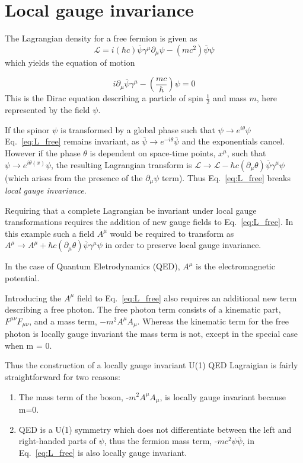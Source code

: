 \section{Local gauge invariance}
\label{subsec:gauge}
The Lagrangian density for a free fermion is given as
\begin{equation}
  \label{eq:L_free}
  \mathcal{L} = i(\hbar c)\overline{\psi}\gamma^{\mu}\partial_{\mu}\psi - (mc^{2})\overline{\psi}\psi
\end{equation}
which yields the equation of motion

\begin{equation}
 i\partial_{\mu}\overline{\psi}\gamma^{\mu} -  (\frac{mc}{\hbar})\psi = 0
\end{equation}
This is the Dirac equation describing a particle of spin $\frac{1}{2}$ and mass $m$, here represented by the field $\psi$. 

If the spinor $\psi$ is transformed by a global phase such that $\psi \to e^{i\theta}\psi$ Eq.~\ref{eq:L_free} remains invariant, as $\overline{\psi} \to e^{-i\theta}\overline{\psi}$ and the exponentials cancel. However if the phase $\theta$ is dependent on space-time points, $x^{\mu}$, such that $\psi \to e^{i\theta(x)}\psi$, the resulting Lagrangian transform is $\mathcal{L} \to \mathcal{L} - \hbar c(\partial_{\mu}\theta)\overline{\psi}\gamma^{\mu}\psi$ (which arises from the presence of the $\partial_{\mu}\psi$ term). Thus Eq.~\ref{eq:L_free} breaks \emph{local gauge invariance}.

Requiring that a complete Lagrangian be invariant under local gauge transformations requires the addition of new gauge fields to Eq.~\ref{eq:L_free}. In this example such a field $A^{\mu}$ would be required to transform as $A^{\mu} \to A^{\mu} + \hbar c(\partial_{\mu}\theta)\overline{\psi}\gamma^{\mu}\psi$ in order to preserve local gauge invariance.

In the case of Quantum Eletrodynamics (QED), $A^{\mu}$ is the electromagnetic potential.

Introducing the $A^{\mu}$ field to Eq.~\ref{eq:L_free} also requires an additional new term describing a free photon. The free photon term consists of a kinematic part, $F^{\mu\nu}F_{\mu\nu}$, and a mass term, $-m^{2}A^{\mu}A_{\mu}$. Whereas the kinematic term for the free photon is locally gauge invariant the mass term is not, except in the special case when m = 0.

Thus the construction of a locally gauge invariant U(1) QED Lagraigian is fairly straightforward for two reasons:
\begin{enumerate}
\item
  The mass term of the boson, -$m^{2}A^{\mu}A_{\mu}$, is locally gauge invariant because m=0.
\item
  QED is a U(1) symmetry which does not differentiate between the left and right-handed parts of $\psi$, thus the fermion mass term, -$mc^{2}\psi\overline{\psi}$, in Eq.~\ref{eq:L_free} is also locally gauge invariant.
\end{enumerate}
